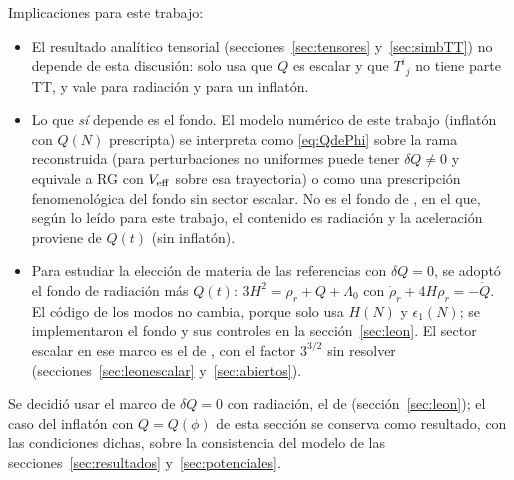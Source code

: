 Implicaciones para este trabajo:
\begin{itemize}[leftmargin=1.6em,itemsep=2pt]
\item El resultado analítico tensorial (secciones~\ref{sec:tensores} y~\ref{sec:simbTT}) no depende de esta discusión: solo usa que $Q$ es escalar y que $T^i{}_j$ no tiene parte TT, y vale para radiación y para un inflatón.
\item Lo que \emph{sí} depende es el fondo. El modelo numérico de este trabajo (inflatón con $Q(N)$ prescripta) se interpreta como \eqref{eq:QdePhi} sobre la rama reconstruida (para perturbaciones no uniformes puede tener $\delta Q\neq0$ y equivale a RG con $V_{\rm eff}$ sobre esa trayectoria) o como una prescripción fenomenológica del fondo sin sector escalar. No es el fondo de \cite{leon22}, en el que, según lo leído para este trabajo, el contenido es radiación y la aceleración proviene de $Q(t)$ (sin inflatón).
\item Para estudiar la elección de materia de las referencias con $\delta Q=0$, se adoptó el fondo de radiación más $Q(t)$: $3H^2=\rho_r+Q+\Lambda_0$ con $\dot\rho_r+4H\rho_r=-\dot Q$. El código de los modos no cambia, porque solo usa $H(N)$ y $\epsilon_1(N)$; se implementaron el fondo y sus controles en la sección~\ref{sec:leon}. El sector escalar en ese marco es el de \cite{leon22,piccirilli23}, con el factor $3^{3/2}$ sin resolver (secciones~\ref{sec:leonescalar} y~\ref{sec:abiertos}).
\end{itemize}

Se decidió usar el marco de $\delta Q=0$ con radiación, el de \cite{leon22,piccirilli23} (sección~\ref{sec:leon}); el caso del inflatón con $Q=Q(\phi)$ de esta sección se conserva como resultado, con las condiciones dichas, sobre la consistencia del modelo de las secciones~\ref{sec:resultados} y~\ref{sec:potenciales}.
